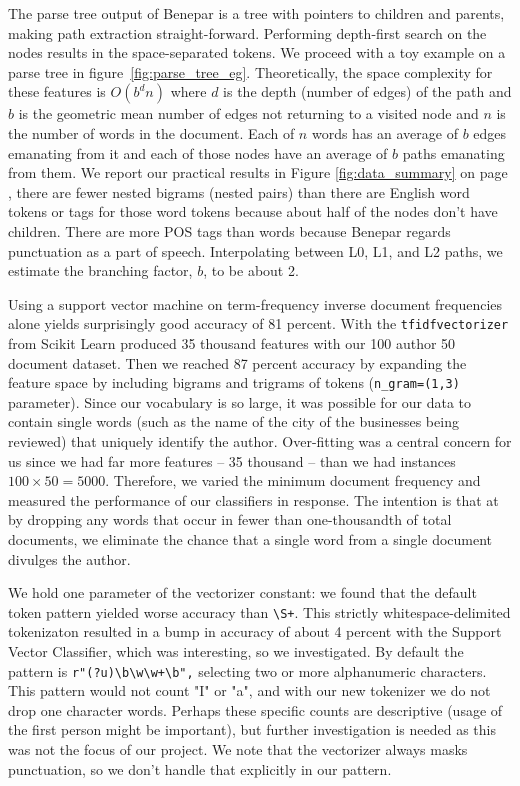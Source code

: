 \documentclass[11pt,a4paper]{article}
\begin{document}
The parse tree output of Benepar is a tree with pointers to children and parents, making path extraction straight-forward. Performing depth-first search on the nodes results in the space-separated tokens. We proceed with a toy example on a parse tree in figure~\ref{fig:parse_tree_eg}. Theoretically, the space complexity for these features is $O(b^d n)$ where $d$ is the depth (number of edges) of the path and $b$ is the geometric mean number of edges not returning to a visited node and $n$ is the number of words in the document. Each of $n$ words has an average of $b$ edges emanating from it and each of those nodes have an average of $b$ paths emanating from them. We report our practical results in Figure \ref{fig:data_summary} on page \pageref{fig:data_summary}, there are fewer nested bigrams (nested pairs) than there are English word tokens or tags for those word tokens because about half of the nodes don't have children. There are more POS tags than words because Benepar regards punctuation as a part of speech. Interpolating between L0, L1, and L2 paths, we estimate the branching factor, $b$, to be about 2.


Using a support vector machine on term-frequency inverse document frequencies alone yields surprisingly good accuracy of 81 percent. With the \texttt{tfidfvectorizer} from Scikit Learn produced 35 thousand features with our 100 author 50 document dataset. Then we reached 87 percent accuracy by expanding the feature space by including bigrams and trigrams of tokens (\verb|n_gram=(1,3)| parameter). Since our vocabulary is so large, it was possible for our data to contain single words (such as the name of the city of the businesses being reviewed) that uniquely identify the author. Over-fitting was a central concern for us since we had far more features -- 35 thousand -- than we had instances $100 \times 50 = 5000$. Therefore, we varied the minimum document frequency and measured the performance of our classifiers in response. The intention is that at by dropping any words that occur in fewer than one-thousandth of total documents, we eliminate the chance that a single word from a single document divulges the author.

We hold one parameter of the vectorizer constant: we found that the default token pattern yielded worse accuracy than \verb|\S+|. This strictly whitespace-delimited tokenizaton resulted in a bump in accuracy of about 4 percent with the Support Vector Classifier, which was interesting, so we investigated. By default the pattern is \verb|r"(?u)\b\w\w+\b",| selecting two or more alphanumeric characters. This pattern would not count "I" or "a", and with our new tokenizer we do not drop one character words. Perhaps these specific counts are descriptive (usage of the first person might be important), but further investigation is needed as this was not the focus of our project. We note that the vectorizer always masks punctuation, so we don't handle that explicitly in our pattern.
\end{document}
